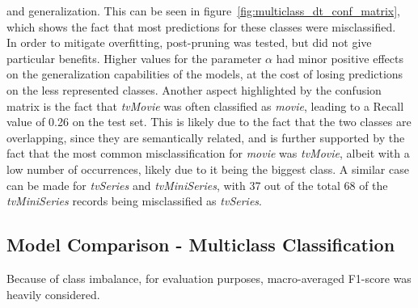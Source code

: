 and generalization. This can be seen in figure~\ref{fig:multiclass_dt_conf_matrix}, which shows the fact
that most predictions for these classes were misclassified.\\
In order to mitigate overfitting, post-pruning was tested, but did not give particular benefits.
Higher values for the parameter $\alpha$ had minor positive effects on the generalization
capabilities of the models, at the cost of losing predictions on the less represented classes.
Another aspect highlighted by the confusion matrix is the fact that \textit{tvMovie} was often
classified as \textit{movie}, leading to a Recall value of 0.26 on the test set.
This is likely due to the fact that the two classes are overlapping, since they are semantically related,
and is further supported by the fact that the most common misclassification for \textit{movie} was
\textit{tvMovie}, albeit with a low number of occurrences, likely due to it being the biggest class.
A similar case can be made for \textit{tvSeries} and \textit{tvMiniSeries}, with 37 out of the total 68
of the \textit{tvMiniSeries} records being misclassified as \textit{tvSeries}.



\subsection{Model Comparison - Multiclass Classification}
Because of class imbalance, for evaluation purposes,
macro-averaged F1-score was heavily considered.